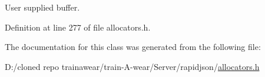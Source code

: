 User supplied buffer. 



Definition at line 277 of file allocators.\+h.



The documentation for this class was generated from the following file\+:\begin{DoxyCompactItemize}
\item 
D\+:/cloned repo trainawear/train-\/\+A-\/wear/\+Server/rapidjson/\mbox{\hyperlink{allocators_8h}{allocators.\+h}}\end{DoxyCompactItemize}
